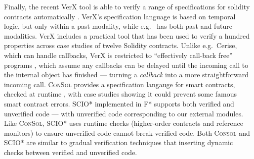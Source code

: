




Finally, the recent VerX tool is able to verify a range of
specifications for solidity contracts automatically \cite{VerX}.
VerX's specification language is based on
temporal logic, 
but only within a past modality, while e.g.\ \citet{OOPSLA22} has both past
and future modalities.
%
%
%
VerX includes a practical tool that has
been used to verify a hundred properties across case studies of
twelve Solidity contracts.
%
%
%
Unlike e.g.\ Cerise, which can handle callbacks, VerX
is restricted to ``effectively call-back free'' programs
\cite{Grossman,relaxed-callbacks-ToDES}, which assume any
callbacks can be delayed until the
incoming call to the internal object has finished 
--- turning a \textit{callback}
into a more straightforward  incoming call. 
%
\textsc{ConSol} \cite{consolidating-pldi2024}
provides a specification langauge for smart contracts,
checked at runtime \cite{FinFel01},  with case studies 
showing it could prevent some famous smart contract errors.
SCIO* \cite{secure-io-fstar-popl2024} implemented in
F*
supports both
verified and unverified code --- with unverified code 
corresponding to our external modules. 
Like \textsc{ConSol},   SCIO* uses runtime checks
(higher-order contracts and reference monitors)
to ensure unverified
code cannot break verified code.
Both \textsc{Consol} and SCIO* are 
similar to gradual verification techniques 
\cite{gradual-verification-popl2024,Cok2022} that
                                             inserting dynamic checks between verified and unverified code.



